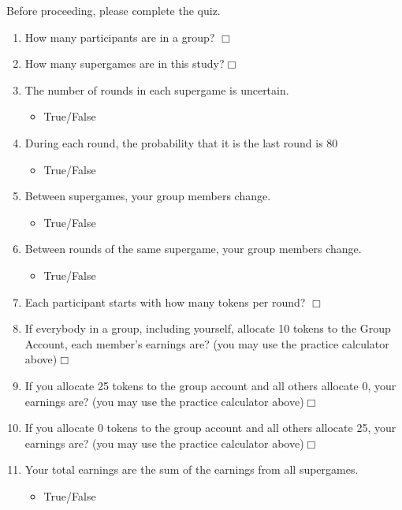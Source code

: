 \documentclass[12pt,letterpaper,english]{article}
\begin{document}
Before proceeding, please complete the quiz.
\begin{enumerate}
    \item How many participants are in a group? $\Box$
    \item How many supergames are in this study?$\Box$

\item The number of rounds in each supergame is uncertain. 
\begin{itemize}
    \item True/False
\end{itemize}

\item  During each round, the probability that it is the last round is 80%
\begin{itemize}
    \item True/False
\end{itemize}

\item  Between supergames, your group members change.

\begin{itemize}
    \item True/False
\end{itemize}

\item Between rounds of the same supergame, your group members change.

 \begin{itemize}
    \item True/False
\end{itemize}

\item Each participant starts with how many tokens per round? $\Box$
\item If everybody in a group, including yourself, allocate 10 tokens to the Group Account, each member's earnings are? (you may use the practice calculator above)$\Box$


\item If you allocate 25 tokens to the group account and all others allocate 0, your earnings are? (you may use the practice calculator above)$\Box$

\item If you allocate 0 tokens to the group account and all others allocate 25, your earnings are? (you may use the practice calculator above)$\Box$

\item Your total earnings are the sum of the earnings from all supergames. 

\begin{itemize}
    \item True/False
\end{itemize}
\end{enumerate}
\newpage
\end{document}
